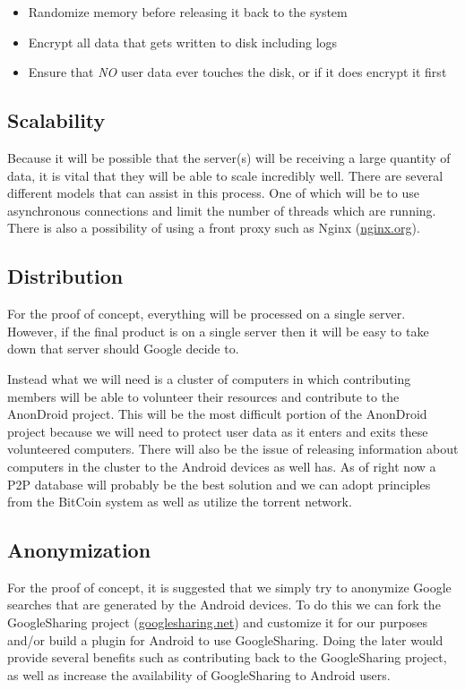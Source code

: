 \documentclass[a4paper]{article}
\begin{document}
\begin{itemize}

\item Randomize memory before releasing it back to the system
\item Encrypt all data that gets written to disk including logs
\item Ensure that \emph{NO} user data ever touches the disk, or if it does
encrypt it first

\end{itemize}

\subsection{Scalability}
Because it will be possible that the server(s) will be receiving a large
quantity of data, it is vital that they will be able to scale incredibly well.
There are several different models that can assist in this process. One of
which will be to use asynchronous connections and limit the number of threads
which are running. There is also a possibility of using a front proxy such as
Nginx (\href{http://wiki.nginx.org/Main}{nginx.org}).

\subsection{Distribution}
For the proof of concept, everything will be processed on a single server.
However, if the final product is on a single server then it will be easy to
take down that server should Google decide to. 

  Instead what we will need is a cluster of computers in which contributing
members will be able to volunteer their resources and contribute to the
AnonDroid project. This will be the most difficult portion of the AnonDroid
project because we will need to protect user data as it enters and exits these
volunteered computers. There will also be the issue of releasing information
about computers in the cluster to the Android devices as well has. As of right
now a P2P database will probably be the best solution and we can adopt
principles from the BitCoin system as well as utilize the torrent network. 

\subsection{Anonymization}

For the proof of concept, it is suggested that we simply try to anonymize
Google searches that are generated by the Android devices. To do this we can
fork the GoogleSharing project
(\href{http://www.googlesharing.net/}{googlesharing.net}) and customize it for
our purposes and/or build a plugin for Android to use GoogleSharing. Doing the
later would provide several benefits such as contributing back to the
GoogleSharing project, as well as increase the availability of GoogleSharing to
Android users.
\end{document}
